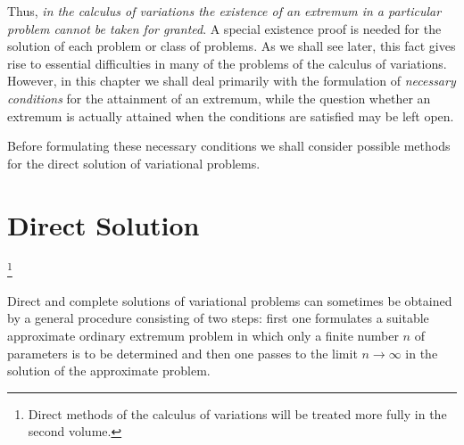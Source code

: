 Thus, \emph{in the calculus of variations the existence of an extremum in a particular problem cannot be taken for granted}. A special existence proof is needed for the solution of each problem or class of problems. As we shall see later, this fact gives rise to essential difficulties in many of the problems of the calculus of variations. However, in this chapter we shall deal primarily with the formulation of \emph{necessary conditions} for the attainment of an extremum, while the question whether an extremum is actually attained when the conditions are satisfied may be left open.

Before formulating these necessary conditions we shall consider possible methods for the direct solution of variational problems.

\section{Direct Solution}\footnote{Direct methods of the calculus of variations will be treated more fully in the second volume.}

Direct and complete solutions of variational problems can sometimes be obtained by a general procedure consisting of two steps: first one formulates a suitable approximate ordinary extremum problem in which only a finite number $n$ of parameters is to be determined and then one passes to the limit $n\to\infty$ in the solution of the approximate problem.

